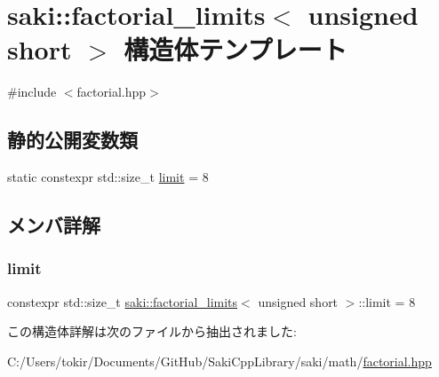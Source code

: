 \hypertarget{structsaki_1_1factorial__limits_3_01unsigned_01short_01_4}{}\section{saki\+:\+:factorial\+\_\+limits$<$ unsigned short $>$ 構造体テンプレート}
\label{structsaki_1_1factorial__limits_3_01unsigned_01short_01_4}


{\ttfamily \#include $<$factorial.\+hpp$>$}

\subsection*{静的公開変数類}
\begin{DoxyCompactItemize}
\item 
static constexpr std\+::size\+\_\+t \mbox{\hyperlink{structsaki_1_1factorial__limits_3_01unsigned_01short_01_4_ac406679bfa5d5745f9d7d772c5a9ec83}{limit}} = 8
\end{DoxyCompactItemize}


\subsection{メンバ詳解}
\mbox{\label{structsaki_1_1factorial__limits_3_01unsigned_01short_01_4_ac406679bfa5d5745f9d7d772c5a9ec83}} 
\subsubsection{\texorpdfstring{limit}{limit}}
{\footnotesize\ttfamily constexpr std\+::size\+\_\+t \mbox{\hyperlink{structsaki_1_1factorial__limits}{saki\+::factorial\+\_\+limits}}$<$ unsigned short $>$\+::limit = 8\hspace{0.3cm}{\ttfamily [static]}}



この構造体詳解は次のファイルから抽出されました\+:\begin{DoxyCompactItemize}
\item 
C\+:/\+Users/tokir/\+Documents/\+Git\+Hub/\+Saki\+Cpp\+Library/saki/math/\mbox{\hyperlink{factorial_8hpp}{factorial.\+hpp}}\end{DoxyCompactItemize}
